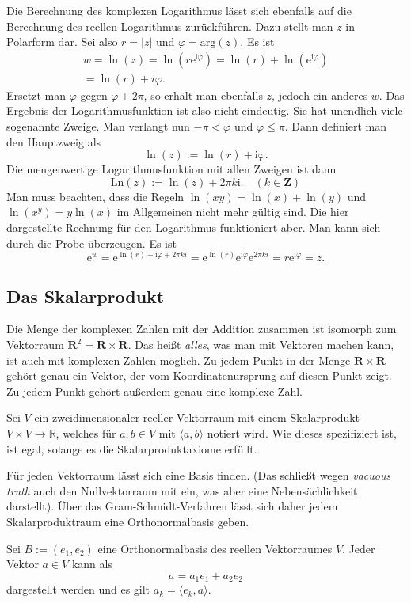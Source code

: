 \documentclass[a4paper,10pt,fleqn,twocolumn,twoside]{article}
\newcommand{\ui}{\mathrm i}
\newcommand{\ee}{\mathrm e}
\newcommand{\R}{\mathbb R}
\begin{document}
Die Berechnung des komplexen Logarithmus lässt sich ebenfalls
auf die Berechnung des reellen Logarithmus zurückführen. Dazu stellt
man $z$ in Polarform dar. Sei also $r=|z|$ und
$\varphi = \mathrm{arg}(z)$. Es ist
\begin{gather*}
w = \ln(z) = \ln(r\ee^{\ui\varphi})
= \ln(r)+\ln(\ee^{\ui\varphi})\\
= \ln(r)+i\varphi.
\end{gather*}
Ersetzt man $\varphi$ gegen $\varphi+2\pi$, so erhält man
ebenfalls $z$, jedoch ein anderes $w$. Das Ergebnis der
Logarithmusfunktion ist also nicht eindeutig. Sie hat unendlich
viele sogenannte Zweige. Man verlangt nun $-\pi<\varphi$ und
$\varphi\le\pi$. Dann definiert man den Hauptzweig als
\[\ln(z):=\ln(r)+\ui\varphi.\]
Die mengenwertige Logarithmusfunktion mit allen Zweigen ist dann
\[\mathrm{Ln}(z):=\ln(z)+2\pi k\ui.\quad(k\in\mathbf Z)\]
Man muss beachten, dass die Regeln $\ln(xy)=\ln(x)+\ln(y)$
und $\ln(x^y)=y\ln(x)$ im Allgemeinen nicht mehr gültig sind.
Die hier dargestellte Rechnung für den Logarithmus funktioniert aber.
Man kann sich durch die Probe überzeugen. Es ist
\[\ee^w = \ee^{\ln(r)+\ui\varphi+2\pi ki}
= \ee^{\ln(r)}\ee^{\ui\varphi}\ee^{2\pi ki} = r\ee^{\ui\varphi} = z.\]

\subsection{Das Skalarprodukt}

Die Menge der komplexen Zahlen mit der Addition zusammen ist
isomorph zum Vektorraum
$\mathbf{R}^2 = \mathbf{R}\times\mathbf{R}$.
Das heißt \textit{alles}, was man mit Vektoren machen kann, ist auch
mit komplexen Zahlen möglich. Zu jedem Punkt in der Menge
$\mathbf{R}\times\mathbf{R}$ gehört genau ein Vektor, der vom
Koordinatenursprung auf diesen Punkt zeigt. Zu jedem Punkt gehört
außerdem genau eine komplexe Zahl.

Sei $V$ ein zweidimensionaler reeller Vektorraum mit einem Skalarprodukt
$V\times V\to\R$, welches für $a,b\in V$
mit $\langle a,b\rangle$ notiert wird.
Wie dieses spezifiziert ist, ist egal, solange es die
Skalarproduktaxiome erfüllt.

Für jeden Vektorraum lässt sich eine Basis finden. (Das schließt
wegen \emph{vacuous truth} auch den Nullvektorraum mit ein, was
aber eine Nebensächlichkeit darstellt). Über das Gram-Schmidt-Verfahren
lässt sich daher jedem Skalarproduktraum eine Orthonormalbasis geben.

Sei $B:=(e_1,e_2)$ eine Orthonormalbasis des reellen Vektorraumes $V$.
Jeder Vektor $a\in V$ kann als
\begin{equation}
a = a_1 e_1+a_2 e_2
\end{equation}
dargestellt werden und es gilt $a_k=\langle e_k,a\rangle$.
\end{document}
